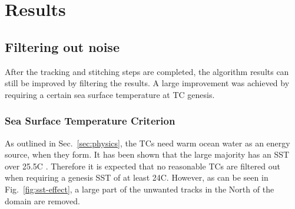 \chapter{Results}\label{sec:results}

\section{Filtering out noise}\label{sec:noise}
After the tracking and stitching steps are completed, the algorithm results can
still be improved by filtering the results. A large improvement was
achieved by requiring a certain sea surface temperature at TC genesis.
\subsection*{Sea Surface Temperature Criterion}
As outlined in Sec.~\ref{sec:physics}, the TCs need warm ocean water as an
energy source, when they form. It has been shown that the large
majority has an SST over 25.5\degree C \cite{sst-paper}. Therefore it is
expected that no reasonable TCs are filtered out when requiring a genesis SST
of at least 24\degree C. However, as can be seen in Fig.~\ref{fig:sst-effect},
a large part of the unwanted tracks in the North of the domain are removed.
